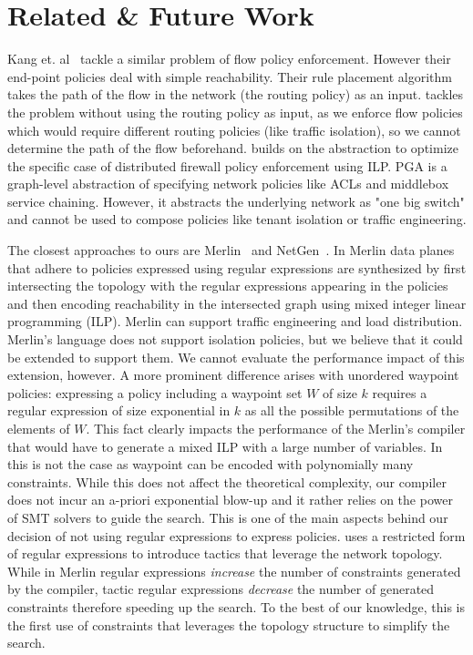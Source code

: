 \section{Related \& Future Work} \label{sec:relatedwork}

Kang et. al~\cite{oneswitch} tackle a similar problem of flow policy
enforcement. However their end-point policies deal with simple
reachability. Their rule placement algorithm takes the path of the
flow in the network  (the routing policy) as an input.%
\Name tackles the
problem without using the routing policy as input, as we enforce flow
policies which would require different routing policies (like traffic
isolation), so we cannot determine the path of the flow
beforehand. %
\cite{distfirewall} builds on the
\cite{oneswitch} abstraction to optimize the specific case of
distributed firewall policy enforcement using ILP.  PGA \cite{pga} is
a graph-level abstraction of specifying network policies like ACLs and
middlebox service chaining. However, it abstracts the underlying
network as "one big switch" and cannot be used to compose policies like
tenant isolation or traffic engineering.

The closest approaches to ours are Merlin~\cite{merlin} and
NetGen~\cite{netgen}.  In Merlin data planes that adhere to policies
expressed using regular expressions are synthesized by first
intersecting the topology with the regular expressions appearing in
the policies and then encoding reachability in the intersected graph
using mixed integer linear programming (ILP).
Merlin can support traffic engineering and load distribution.
Merlin's language does not support isolation policies, but we believe
that it could be extended to support them.  We cannot evaluate the
performance impact of this extension, however.  A more prominent
difference arises with unordered waypoint policies: expressing a
policy including a waypoint set $W$ of size $k$ requires a regular
expression of size exponential in $k$ as all the possible permutations
of the elements of $W$. This fact clearly impacts the performance of
the Merlin's compiler that would have to generate a mixed ILP with a
large number of variables.  In \Name this is not the case as waypoint
can be encoded with polynomially many constraints.  While this does
not affect the theoretical complexity, our compiler does not incur
an a-priori exponential blow-up and it rather relies on the power
of SMT solvers to guide the search.  This is one of the main aspects
behind our decision of not using regular expressions to express
policies.  \Name uses a restricted form of regular expressions to
introduce tactics that leverage the network topology.  While in Merlin
regular expressions \emph{increase} the number of constraints
generated by the compiler, tactic regular expressions \emph{decrease}
the number of generated constraints therefore speeding up the search.
To the best of our knowledge, this is the first use of constraints
that leverages the topology structure to simplify the search.

